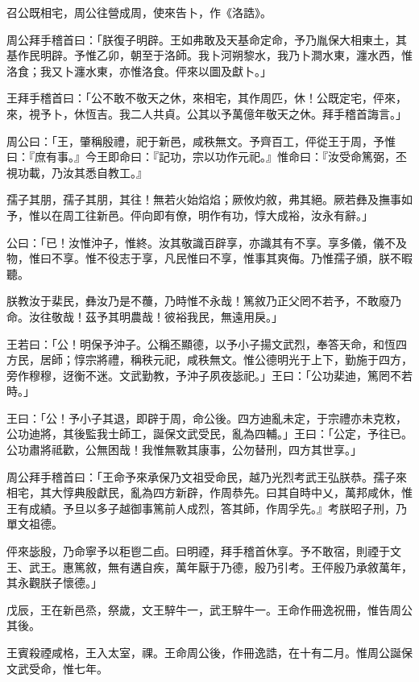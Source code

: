 
\begin{pinyinscope}
召公既相宅，周公往營成周，使來告卜，作《洛誥》。

周公拜手稽首曰：「朕復子明辟。王如弗敢及天基命定命，予乃胤保大相東土，其基作民明辟。予惟乙卯，朝至于洛師。我卜河朔黎水，我乃卜澗水東，瀍水西，惟洛食；我又卜瀍水東，亦惟洛食。伻來以圖及獻卜。」

王拜手稽首曰：「公不敢不敬天之休，來相宅，其作周匹，休！公既定宅，伻來，來，視予卜，休恆吉。我二人共貞。公其以予萬億年敬天之休。拜手稽首誨言。」

周公曰：「王，肇稱殷禮，祀于新邑，咸秩無文。予齊百工，伻從王于周，予惟曰：『庶有事。』今王即命曰：『記功，宗以功作元祀。』惟命曰：『汝受命篤弼，丕視功載，乃汝其悉自教工。』

孺子其朋，孺子其朋，其往！無若火始焰焰；厥攸灼敘，弗其絕。厥若彝及撫事如予，惟以在周工往新邑。伻向即有僚，明作有功，惇大成裕，汝永有辭。」

公曰：「已！汝惟沖子，惟終。汝其敬識百辟享，亦識其有不享。享多儀，儀不及物，惟曰不享。惟不役志于享，凡民惟曰不享，惟事其爽侮。乃惟孺子頒，朕不暇聽。

朕教汝于棐民，彝汝乃是不蘉，乃時惟不永哉！篤敘乃正父罔不若予，不敢廢乃命。汝往敬哉！茲予其明農哉！彼裕我民，無遠用戾。」

王若曰：「公！明保予沖子。公稱丕顯德，以予小子揚文武烈，奉答天命，和恆四方民，居師；惇宗將禮，稱秩元祀，咸秩無文。惟公德明光于上下，勤施于四方，旁作穆穆，迓衡不迷。文武勤教，予沖子夙夜毖祀。」王曰：「公功棐迪，篤罔不若時。」

王曰：「公！予小子其退，即辟于周，命公後。四方迪亂未定，于宗禮亦未克敉，公功迪將，其後監我士師工，誕保文武受民，亂為四輔。」王曰：「公定，予往已。公功肅將祗歡，公無困哉！我惟無斁其康事，公勿替刑，四方其世享。」

周公拜手稽首曰：「王命予來承保乃文祖受命民，越乃光烈考武王弘朕恭。孺子來相宅，其大惇典殷獻民，亂為四方新辟，作周恭先。曰其自時中乂，萬邦咸休，惟王有成績。予旦以多子越御事篤前人成烈，答其師，作周孚先。』考朕昭子刑，乃單文祖德。

伻來毖殷，乃命寧予以秬鬯二卣。曰明禋，拜手稽首休享。予不敢宿，則禋于文王、武王。惠篤敘，無有遘自疾，萬年厭于乃德，殷乃引考。王伻殷乃承敘萬年，其永觀朕子懷德。」

戊辰，王在新邑烝，祭歲，文王騂牛一，武王騂牛一。王命作冊逸祝冊，惟告周公其後。

王賓殺禋咸格，王入太室，祼。王命周公後，作冊逸誥，在十有二月。惟周公誕保文武受命，惟七年。


\end{pinyinscope}